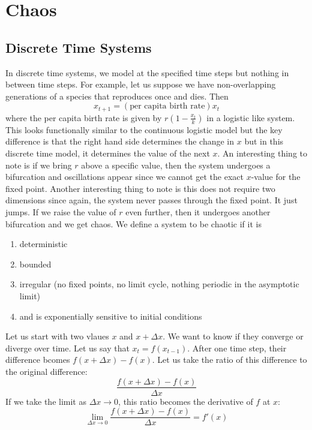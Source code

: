 \documentclass{article}
\theoremstyle{definition}
\begin{document}
\section{Chaos}
\subsection{Discrete Time Systems}
In discrete time systems, we model at the specified time steps but nothing in between time steps. For example,  let us suppose we have non-overlapping generations of a species that reproduces once and dies. Then 
\begin{equation*}
    x_{t+1} = (\text{per capita birth rate})x_t
\end{equation*}
where the per capita birth rate is given by $r\left( 1- \frac{x_t}{k} \right)$ in a logistic like system. This looks functionally similar to the continuous logistic model but the key difference is that the right hand side determines the change in $x$ but in this discrete time model, it determines the value of the next $x$. An interesting thing to note is if we bring $r$ above a specific value, then the system undergoes a bifurcation and oscillations appear since we cannot get the exact $x$-value for the fixed point. Another interesting thing to note is this does not require two dimensions since again, the system never passes through the fixed point. It just jumps. If we raise the value of $r$ even further, then it undergoes another bifurcation and we get chaos. We define a system to be chaotic if it is 
\begin{enumerate}
    \item deterministic
    \item bounded
    \item irregular (no fixed points, no limit cycle, nothing periodic in the asymptotic limit)
    \item and is exponentially sensitive to initial conditions
\end{enumerate}
Let us start with two vlaues $x$ and $x+\Delta x$. We want to know if they converge or diverge over time. Let us say that $x_t = f(x_{t-1})$. After one time step, their difference bcomes $f(x+\Delta x) - f(x)$. Let us take the ratio of this difference to the original difference:
\begin{equation*}
    \frac{f(x+\Delta x) - f(x)}{\Delta x}
\end{equation*}
If we take the limit as $\Delta x \to 0$, this ratio becomes the derivative of $f$ at $x$:
\begin{equation*}
    \lim_{\Delta x \to 0} \frac{f(x+\Delta x) - f(x)}{\Delta x} = f'(x)
\end{equation*}
\end{document}
